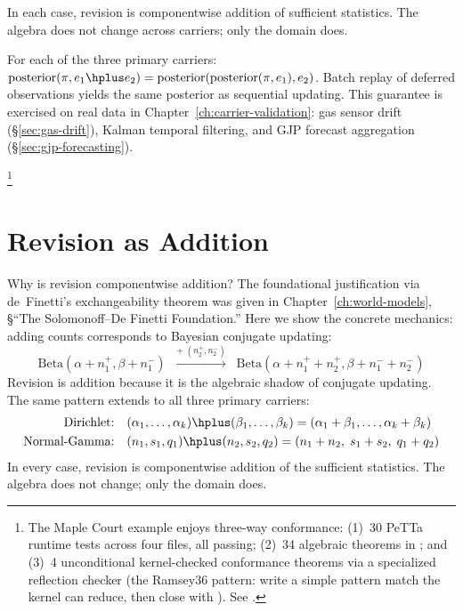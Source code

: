 \documentclass[11pt,openany]{report}
\begin{document}
\medskip\noindent
In each case, revision is componentwise addition of sufficient
statistics.  The algebra does not change across carriers; only the
domain does.

\begin{theorem}
\label{thm:sleep-consolidation}
For each of the three primary carriers:
$\mathrm{posterior}(\pi, e_1 \hplus e_2)
= \mathrm{posterior}(\mathrm{posterior}(\pi, e_1), e_2)$.
Batch replay of deferred observations yields the same posterior as
sequential updating.  This guarantee is exercised on real data in
Chapter~\ref{ch:carrier-validation}: gas sensor drift
(\S\ref{sec:gas-drift}), Kalman temporal filtering, and GJP
forecast aggregation (\S\ref{sec:gjp-forecasting}).
\end{theorem}

%
\footnote{The Maple Court example enjoys three-way conformance:
(1)~30 PeTTa runtime tests across four  files, all
passing; (2)~34 algebraic theorems in
; and
(3)~4 unconditional kernel-checked conformance theorems via a
specialized reflection checker (the Ramsey36 pattern: write a
simple pattern match the kernel can reduce, then close with
).  See
.}


\section{Revision as Addition}

Why is revision componentwise addition?  The foundational justification
via de~Finetti's exchangeability theorem was given in
Chapter~\ref{ch:world-models}, \S``The Solomonoff--De Finetti
Foundation.''  Here we show the concrete mechanics: adding counts
corresponds to Bayesian conjugate updating:
\[
  \text{Beta}(\alpha + n_1^+, \beta + n_1^-)
  \;\;\xrightarrow{+\;(n_2^+, n_2^-)}\;\;
  \text{Beta}(\alpha + n_1^+ + n_2^+, \beta + n_1^- + n_2^-)
\]
Revision is addition because it is the algebraic shadow of conjugate
updating.  The same pattern extends to all three primary carriers:
\begin{align*}
  \text{Dirichlet:}\quad
  &(\alpha_1, \ldots, \alpha_k) \hplus (\beta_1, \ldots, \beta_k)
  = (\alpha_1 + \beta_1, \ldots, \alpha_k + \beta_k) \\
  \text{Normal-Gamma:}\quad
  &(n_1, s_1, q_1) \hplus (n_2, s_2, q_2)
  = (n_1 + n_2,\; s_1 + s_2,\; q_1 + q_2)
\end{align*}
In every case, revision is componentwise addition of the sufficient
statistics.  The algebra does not change; only the domain does.
\end{document}

